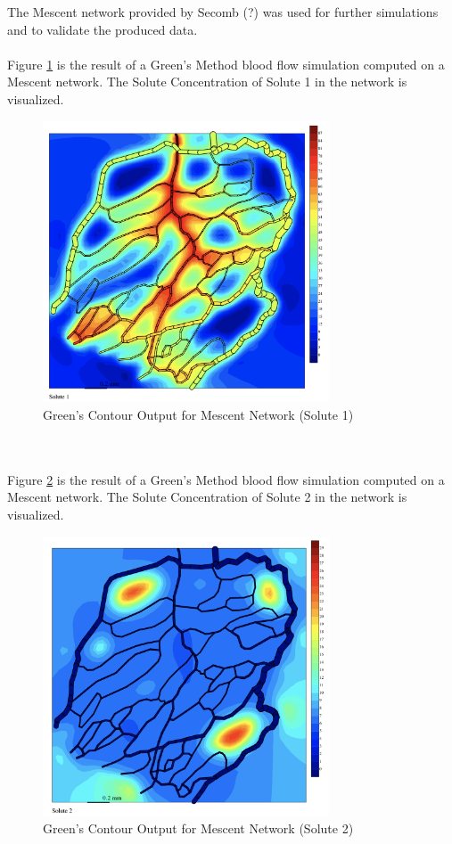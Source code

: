 The Mescent network provided by Secomb (?) was used for further simulations and to validate the produced data.\\
\\Figure \ref{fig:Contour_Mescent1}  is the result of a Green's Method blood flow simulation computed on a Mescent network. The Solute Concentration of Solute 1 in the network is visualized.\\
\begin{figure}[h]
\centering
\includegraphics[width=85mm]{Contour_Mescent1}
\caption{\footnotesize Green's Contour Output for Mescent Network (Solute 1)}
\label{fig:Contour_Mescent1}
\end{figure}\\
%
\\Figure \ref{fig:Contour_Mescent2}  is the result of a Green's Method blood flow simulation computed on a Mescent network. The Solute Concentration of Solute 2 in the network is visualized.\\
\begin{figure}[h]
\centering
\includegraphics[width=85mm]{Contour_Mescent2}
\caption{\footnotesize Green's Contour Output for Mescent Network (Solute 2)}
\label{fig:Contour_Mescent2}
\end{figure}


